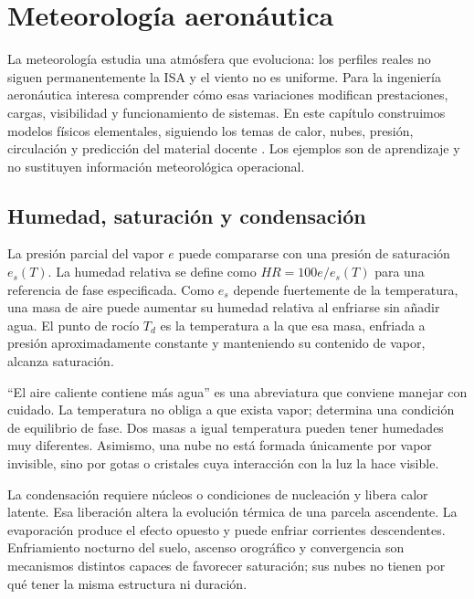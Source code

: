 \chapter{Meteorología aeronáutica}\label{ch:05}

La meteorología estudia una atmósfera que evoluciona: los perfiles reales no siguen permanentemente la ISA y el viento no es uniforme. Para la ingeniería aeronáutica interesa comprender cómo esas variaciones modifican prestaciones, cargas, visibilidad y funcionamiento de sistemas. En este capítulo construimos modelos físicos elementales, siguiendo los temas de calor, nubes, presión, circulación y predicción del material docente \cite{TAE2}. Los ejemplos son de aprendizaje y no sustituyen información meteorológica operacional.

\section{Humedad, saturación y condensación}
La presión parcial del vapor $e$ puede compararse con una presión de saturación $e_s(T)$. La humedad relativa se define como $HR=100e/e_s(T)$ para una referencia de fase especificada. Como $e_s$ depende fuertemente de la temperatura, una masa de aire puede aumentar su humedad relativa al enfriarse sin añadir agua. El punto de rocío $T_d$ es la temperatura a la que esa masa, enfriada a presión aproximadamente constante y manteniendo su contenido de vapor, alcanza saturación.

``El aire caliente contiene más agua'' es una abreviatura que conviene manejar con cuidado. La temperatura no obliga a que exista vapor; determina una condición de equilibrio de fase. Dos masas a igual temperatura pueden tener humedades muy diferentes. Asimismo, una nube no está formada únicamente por vapor invisible, sino por gotas o cristales cuya interacción con la luz la hace visible.

La condensación requiere núcleos o condiciones de nucleación y libera calor latente. Esa liberación altera la evolución térmica de una parcela ascendente. La evaporación produce el efecto opuesto y puede enfriar corrientes descendentes. Enfriamiento nocturno del suelo, ascenso orográfico y convergencia son mecanismos distintos capaces de favorecer saturación; sus nubes no tienen por qué tener la misma estructura ni duración.

